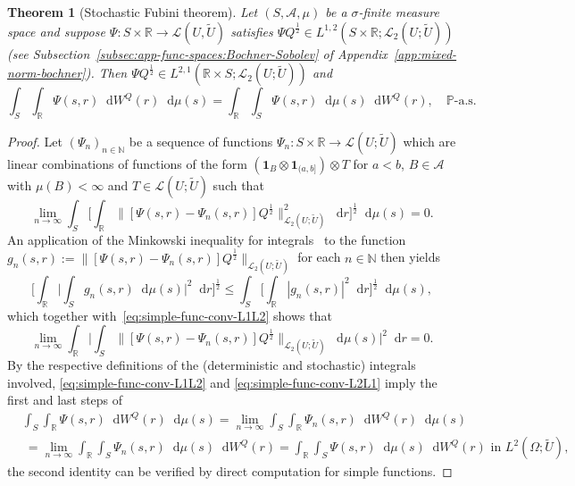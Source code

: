 \documentclass[reqno]{amsart}
\numberwithin{equation}{section}
\newcommand{\bbP}{\mathbb{P}}
\newcommand{\bbR}{\mathbb{R}}
\newcommand{\R}{\mathbb{R}}
\newcommand{\N}{\mathbb{N}}
\newcommand{\rd}{\mathop{}\!\mathrm{d}}
\newcommand{\from}{\colon}
\newcommand{\LO}{\mathscr L}
\newtheorem{theorem}[lemma]{Theorem}
\theoremstyle{remark}
\theoremstyle{definition}
\begin{document}
\begin{theorem}[Stochastic Fubini theorem]\label{thm:stoch-fub}
	Let $(S, \mathscr A, \mu)$ be a $\sigma$-finite measure space
	and suppose $\Psi \from S \times \R \to \mathscr L(U, \widetilde U)$ 
	satisfies $\Psi Q^{\frac{1}{2}} \in L^{1,2}(S \times \R; \LO_2(U;\widetilde{U}))$
	(see Subsection~\ref{subsec:app-func-spaces:Bochner-Sobolev} of Appendix~\ref{app:mixed-norm-bochner}).
	Then
	$\Psi Q^\frac{1}{2} \in L^{2,1}(\R \times S; \LO_2(U;\widetilde{U}))$
	and
	\begin{equation}\label{eq:interchange-det-stoch-int}
		\int_{S} \int_\R \Psi(s,r) \rd W^Q(r) \rd \mu(s)
		=
		\int_\R \int_{S} \Psi(s,r) \rd \mu(s) \rd W^Q(r),
		\quad 
		\bbP\text{-a.s.}
	\end{equation}
\end{theorem}
%
\begin{proof}
	Let $(\Psi_n)_{n\in \N}$ be a sequence of functions
	$\Psi_n \from S \times \R \to \mathscr L(U; \widetilde U)$ 
	which are linear combinations of 
	functions of the form 
	$(\mathbf 1_B \otimes \mathbf 1_{(a, b]}) \otimes T$
	for $a < b$, $B \in \mathscr A$ with $\mu(B) < \infty$ 
	and $T \in \LO(U; \widetilde U)$ such that
	\begin{equation}\label{eq:simple-func-conv-L1L2}
		\lim_{n \to \infty} 
		\int_{S} 
		\biggl[ \int_\R \| [\Psi(s,r) - \Psi_n(s,r)] Q^\frac{1}{2}\|^2_{\mathscr L_2(U; \widetilde U)} \rd r \biggr]^{\frac{1}{2}}  
		\rd \mu(s) 
		=
		0.
	\end{equation}
	An application of the Minkowski inequality for integrals~\cite[Section~A.1]{Stein1970}
	to the function $g_n(s, r) := \| [\Psi(s,r) - \Psi_n(s,r)] Q^\frac{1}{2}\|_{\mathscr L_2(U; \widetilde U)}$
	for each $n \in \N$
	then yields
	\[
	\biggl[  
	\int_{\bbR} 
	\biggl| 
	\int_S g_n(s, r) \rd \mu(s) 
	\biggr|^2 
	\rd r \biggr]^{\frac{1}{2}}
	\leq 
	\int_{S} 
	\biggl[ 
	\int_{\bbR} 
	|g_n(s, r)|^2 \rd r \biggr]^{\frac{1}{2}} 
	\rd \mu(s),
	\]
	which together with~\eqref{eq:simple-func-conv-L1L2} shows that 
	\begin{equation}\label{eq:simple-func-conv-L2L1}
		\lim_{n \to \infty} 
		\int_{\R} 
		\biggl| \int_S \| [\Psi(s,r) - \Psi_n(s,r)] Q^\frac{1}{2}\|_{\mathscr L_2(U; \widetilde U)} \rd \mu(s) \biggr|^2  
		\rd r
		=
		0.
	\end{equation} 
	By the respective definitions
	of the (deterministic and stochastic) integrals
	involved, 
	\eqref{eq:simple-func-conv-L1L2} 
	and \eqref{eq:simple-func-conv-L2L1} 
	imply the first and last steps of
	\begin{align*} 
		&\int_{S} \int_\R \Psi(s,r) \rd W^Q(r) \rd \mu(s)
		=
		\lim_{n\to \infty}
		\int_{S} \int_\R \Psi_n(s,r) \rd W^Q(r) \rd \mu(s)
		\\
		&\:
		=
		\lim_{n\to \infty}
		\int_\R \int_{S} \Psi_n(s,r) \rd \mu(s) \rd W^Q(r) 
		=
		\int_\R \int_{S} \Psi(s,r) \rd \mu(s) \rd W^Q(r) 
		\text{ in } L^2(\Omega; \widetilde U),  
	\end{align*}  
	the second identity can be verified by direct computation
	for simple functions.
\end{proof}
\end{document}

